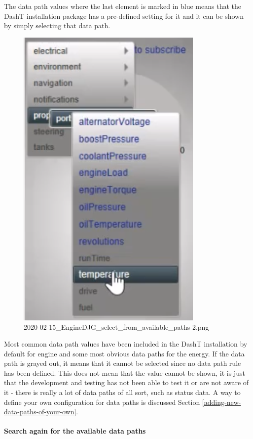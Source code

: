 \documentclass[11pt]{article}
\begin{document}
    The data path values where the last element is marked in blue means that
the DashT installation package has a pre-defined setting for it and it
can be shown by simply selecting that data path.

    \begin{figure}
\centering
\includegraphics{2020-02-15_EngineDJG_select_from_available_paths-2.png}
\caption{2020-02-15\_EngineDJG\_select\_from\_available\_paths-2.png}
\end{figure}

    Most common data path values have been included in the DashT
installation by default for engine and some most obvious data paths for
the energy. If the data path is grayed out, it means that it cannot be
selected since no data path rule has been defined. This does not mean
that the value cannot be shown, it is just that the development and
testing has not been able to test it or are not aware of it - there is
really a lot of data paths of all sort, such as status data. A way to
define your own configuration for data paths is discussed
Section \ref{adding-new-data-paths-of-your-own}.

    \hypertarget{search-again-for-the-available-data-paths}{%
\paragraph{Search again for the available data
paths}\label{search-again-for-the-available-data-paths}}
\end{document}
